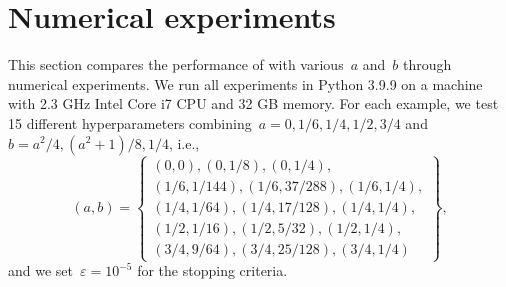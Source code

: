 \documentclass[../main]{subfiles}
\begin{document}
\section{Numerical experiments} 
This section compares the performance of  with various~$a$ and~$b$ through numerical experiments.
We run all experiments in Python 3.9.9 on a machine with 2.3 GHz Intel Core i7 CPU and 32 GB memory.
For each example, we test 15 different hyperparameters combining~$a = 0, 1 / 6, 1 / 4, 1 / 2, 3 / 4$ and~$b = a^2 / 4, (a^2 + 1) / 8, 1 / 4$, i.e.,
\begin{equation}
    (a, b) = \left\{
        \begin{gathered}
            (0, 0), (0, 1 / 8), (0, 1 / 4),\\
            (1 / 6, 1 / 144), (1 / 6, 37 / 288), (1 / 6, 1 / 4),\\
            (1 / 4, 1 / 64), (1 / 4, 17 / 128), (1 / 4, 1 / 4), \\
            (1 / 2, 1 / 16), (1 / 2, 5 / 32), (1 / 2, 1 / 4), \\
            (3 / 4, 9 / 64), (3 / 4, 25 / 128), (3 / 4, 1 / 4)
        \end{gathered}
    \right\},
\end{equation} 
and we set~$\varepsilon = 10^{-5}$ for the stopping criteria.
\end{document}
